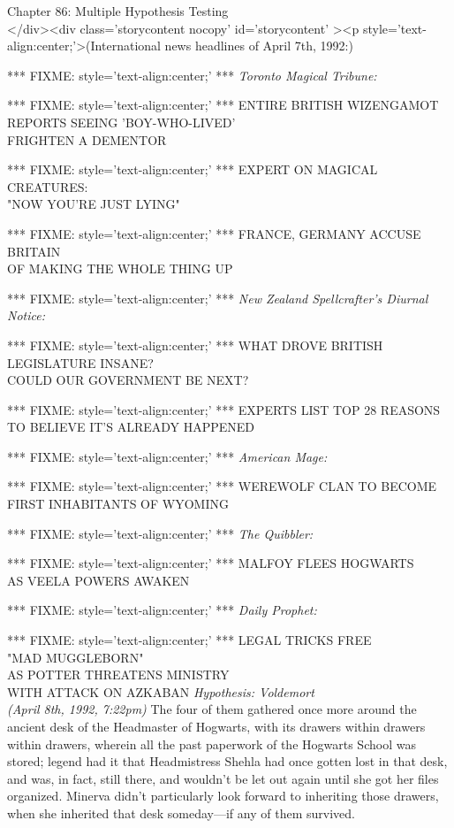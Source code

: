 
Chapter 86: Multiple Hypothesis Testing\\
</div><div  class='storycontent nocopy' id='storycontent' ><p style='text-align:center;'>(International news headlines of April 7th, 1992:)

*** FIXME: style='text-align:center;' ***
\emph{Toronto Magical Tribune:}

*** FIXME: style='text-align:center;' ***
ENTIRE BRITISH WIZENGAMOT\\
REPORTS SEEING 'BOY-WHO-LIVED'\\
FRIGHTEN A DEMENTOR

*** FIXME: style='text-align:center;' ***
EXPERT ON MAGICAL CREATURES:\\
"NOW YOU'RE JUST LYING"

*** FIXME: style='text-align:center;' ***
FRANCE, GERMANY ACCUSE BRITAIN\\
OF MAKING THE WHOLE THING UP

*** FIXME: style='text-align:center;' ***
\emph{New Zealand Spellcrafter's Diurnal Notice:}

*** FIXME: style='text-align:center;' ***
WHAT DROVE BRITISH LEGISLATURE INSANE?\\
COULD OUR GOVERNMENT BE NEXT?

*** FIXME: style='text-align:center;' ***
EXPERTS LIST TOP 28 REASONS\\
TO BELIEVE IT'S ALREADY HAPPENED

*** FIXME: style='text-align:center;' ***
\emph{American Mage:}

*** FIXME: style='text-align:center;' ***
WEREWOLF CLAN TO BECOME\\
FIRST INHABITANTS OF WYOMING

*** FIXME: style='text-align:center;' ***
\emph{The Quibbler:}

*** FIXME: style='text-align:center;' ***
MALFOY FLEES HOGWARTS\\
AS VEELA POWERS AWAKEN

*** FIXME: style='text-align:center;' ***
\emph{Daily Prophet:}

*** FIXME: style='text-align:center;' ***
LEGAL TRICKS FREE\\
"MAD MUGGLEBORN"\\
AS POTTER THREATENS MINISTRY\\
WITH ATTACK ON AZKABAN
\sbreak
\emph{Hypothesis: Voldemort\\
(April 8th, 1992, 7:22pm)}
\sbreak
The four of them gathered once more around the ancient desk of the Headmaster of Hogwarts, with its drawers within drawers within drawers, wherein all the past paperwork of the Hogwarts School was stored; legend had it that Headmistress Shehla had once gotten lost in that desk, and was, in fact, still there, and wouldn't be let out again until she got her files organized. Minerva didn't particularly look forward to inheriting those drawers, when she inherited that desk someday---if any of them survived.

